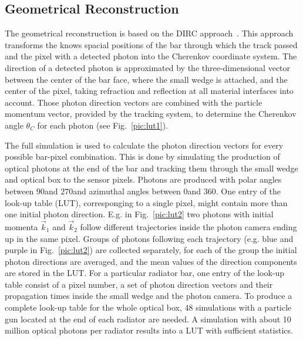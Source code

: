 \subsection{Geometrical Reconstruction}
\label{sec:gr}

The geometrical reconstruction is based on the \babar DIRC approach~\cite{bdirc1}. This approach transforms the knows spacial positions of the bar through which the track passed and the pixel with a detected photon into the Cherenkov coordinate system. The direction of a detected photon is approximated by the three-dimensional vector between the center of the bar face, where the small wedge is attached, and the center of the pixel, taking refraction and reflection at all material interfaces into account. Those photon direction vectors are combined with the particle momentum vector, provided by the tracking system, to determine the Cherenkov angle $\theta_{C}$ for each photon (see Fig.~\ref{pic:lut1}). 

The full simulation is used to calculate the photon direction vectors for every possible bar-pixel combination. This is done by simulating the production of optical photons at the end of the bar and tracking them through the small wedge and optical box to the sensor pixels. Photons are produced with polar angles between $90$\mydeg and $270$\mydeg and azimuthal angles between $0$\mydeg and $360$\mydeg.
One entry of the look-up table (LUT), corresponging to a single pixel, might contain more than one initial photon direction. E.g. in Fig.~\ref{pic:lut2} two photons with initial momenta $\vec k_1$ and $\vec k_2$ follow different trajectories inside the photon camera ending up in the same pixel. 
Groups of photons following each trajectory (e.g. blue and purple in Fig.~\ref{pic:lut2}) are collected separately, for each of the group the initial photon directions are averaged, and the mean values of the direction components are stored in the LUT. For a particular radiator bar, one entry of the look-up table consist of a pixel number, a set of photon direction vectors and their propagation times inside the small wedge and the photon camera. To produce a complete look-up table for the whole optical box, 48 simulations with a particle gun located at the end of each radiator are needed. A simulation with about 10 million optical photons per radiator results into a LUT with sufficient statistics.

